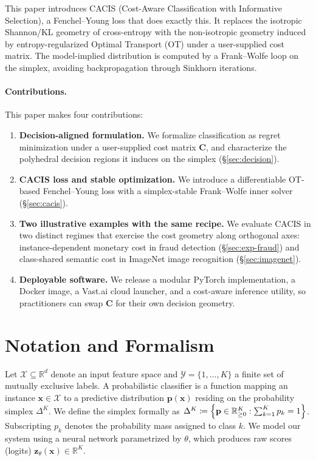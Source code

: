 \documentclass[sigconf,anonymous]{acmart}
\newcommand{\CACIS}{\textsc{CACIS}}
\newcommand{\vx}{\mathbf{x}}
\newcommand{\vz}{\mathbf{z}}
\newcommand{\vp}{\mathbf{p}}
\newcommand{\mC}{\mathbf{C}}
\newcommand{\R}{\mathbb{R}}
\begin{document}
This paper introduces \CACIS{} (Cost-Aware Classification with Informative Selection), a Fenchel--Young loss that does exactly this. It replaces the isotropic Shannon/KL geometry of cross-entropy with the non-isotropic geometry induced by entropy-regularized Optimal Transport (OT) under a user-supplied cost matrix. The model-implied distribution is computed by a Frank--Wolfe loop on the simplex, avoiding backpropagation through Sinkhorn iterations.

\paragraph{Contributions.} This paper makes four contributions:
\begin{enumerate}[leftmargin=1.2em, itemsep=0.2em, topsep=0.2em]
  \item \textbf{Decision-aligned formulation.} We formalize classification as regret minimization under a user-supplied cost matrix $\mC$, and characterize the polyhedral decision regions it induces on the simplex (\S\ref{sec:decision}).
  \item \textbf{\CACIS{} loss and stable optimization.} We introduce a differentiable OT-based Fenchel--Young loss with a simplex-stable Frank--Wolfe inner solver (\S\ref{sec:cacis}).
  \item \textbf{Two illustrative examples with the same recipe.} We evaluate \CACIS{} in two distinct regimes that exercise the cost geometry along orthogonal axes: instance-dependent monetary cost in fraud detection (\S\ref{sec:exp-fraud}) and class-shared semantic cost in ImageNet image recognition (\S\ref{sec:imagenet}).
  \item \textbf{Deployable software.} We release a modular PyTorch implementation, a Docker image, a Vast.ai cloud launcher, and a cost-aware inference utility, so practitioners can swap $\mC$ for their own decision geometry.
\end{enumerate}

\section{Notation and Formalism}
Let $\mathcal{X} \subseteq \R^d$ denote an input feature space and $\mathcal{Y}=\{1,\dots,K\}$ a finite set of mutually exclusive labels. A probabilistic classifier is a function mapping an instance $\vx \in \mathcal{X}$ to a predictive distribution $\vp(\vx)$ residing on the probability simplex $\Delta^K$. We define the simplex formally as $\Delta^K \coloneqq \Bigl\{\vp\in\R^K_{\ge 0}:\textstyle\sum_{k=1}^K p_k = 1\Bigr\}$. Subscripting $p_k$ denotes the probability mass assigned to class $k$. We model our system using a neural network parametrized by $\theta$, which produces raw scores (logits) $\vz_\theta(\vx) \in \R^K$.
\end{document}
